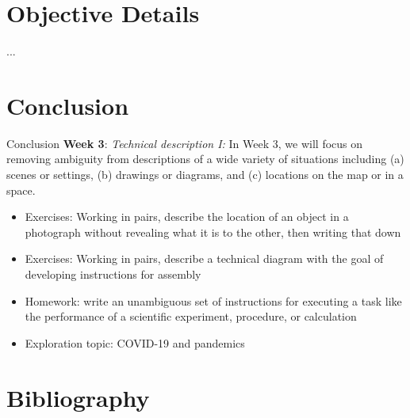\documentclass{beamer}
\begin{document}
\section{Objective Details}

\begin{frame}
...
\end{frame}

\section{Conclusion}

\begin{frame}{Conclusion}
\textbf{Week 3}: \textit{Technical description I:} In Week 3, we will focus on removing ambiguity from descriptions of a wide variety of situations including (a) scenes or settings, (b) drawings or diagrams, and (c) locations on the map or in a space.
\begin{itemize}
\item Exercises: Working in pairs, describe the location of an object in a photograph without revealing what it is to the other, then writing that down
\item Exercises: Working in pairs, describe a technical diagram with the goal of developing instructions for assembly
\item Homework: write an unambiguous set of instructions for executing a task like the performance of a scientific experiment, procedure, or calculation
\item Exploration topic: COVID-19 and pandemics
\end{itemize}
\end{frame}


\section{Bibliography}


\end{document}
